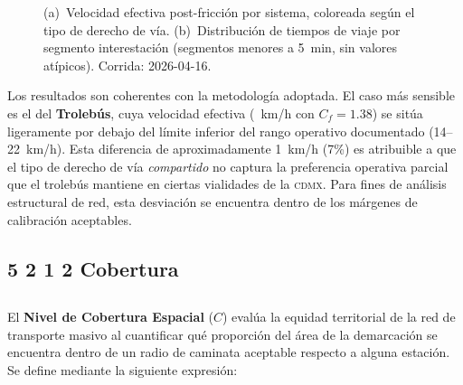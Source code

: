 \begin{figure}[H]
    \centering
    \caption[Caracterización de la impedancia temporal por sistema]{(a)~Velocidad
    efectiva post-fricción por sistema, coloreada según el tipo de derecho de vía.
    (b)~Distribución de tiempos de viaje por segmento interestación (segmentos
    menores a 5~min, sin valores atípicos). Corrida: 2026-04-16.}
    \label{fig:impedancia-sistemas}
\end{figure}

Los resultados son coherentes con la metodología adoptada. El caso más
sensible es el del \textbf{Trolebús}, cuya velocidad efectiva (\DIFdelbegin \DIFdel{~}\DIFdelend \DIFaddbegin \DIFadd{$\approx$\,}~km/h con
$C_f = 1.38$) se sitúa ligeramente por debajo del límite inferior del rango
operativo documentado (14--22~km/h). Esta diferencia de aproximadamente
1~km/h (7\%) es atribuible a que el tipo de derecho de vía \textit{compartido}
no captura la preferencia operativa parcial que el trolebús mantiene en ciertas
vialidades de la \textsc{cdmx}. Para fines de análisis estructural de red,
esta desviación se encuentra dentro de los márgenes de calibración aceptables.

\subsection*{5 2 1 2 Cobertura}
\subsection{}
\label{subsec:cobertura-espacial}
\DIFdelbegin %
\DIFdelend 

El \textbf{Nivel de Cobertura Espacial} ($C$) evalúa la equidad territorial de
la red de transporte masivo al cuantificar qué proporción del área de la
demarcación se encuentra dentro de un radio de caminata aceptable respecto
a alguna estación. Se define mediante la siguiente expresión:


